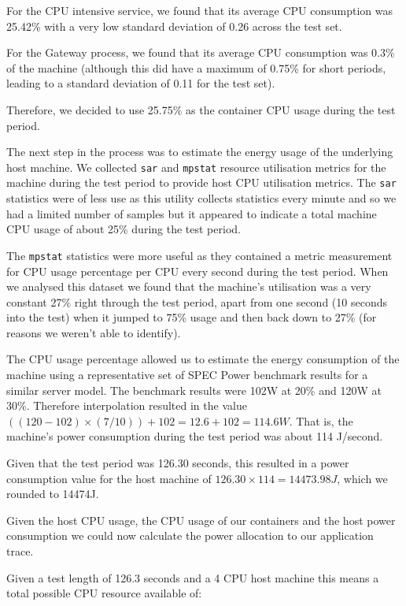 For the CPU intensive service, we found that its average CPU consumption was 25.42\% with a very low standard deviation of 0.26 across the test set.

For the Gateway process, we found that its average CPU consumption was 0.3\% of the machine (although this did have a maximum of 0.75\% for short periods, leading to a standard deviation of 0.11 for the test set).

Therefore, we decided to use 25.75\% as the container CPU usage during the test period.

The next step in the process was to estimate the energy usage of the underlying host machine.  We collected \texttt{sar} and \texttt{mpstat} resource utilisation metrics for the machine during the test period to provide host CPU utilisation metrics.  The \texttt{sar} statistics were of less use as this utility collects statistics every minute and so we had a limited number of samples but it appeared to indicate a total machine CPU usage of about 25\% during the test period.

The \texttt{mpstat} statistics were more useful as they contained a metric measurement for CPU usage percentage per CPU every second during the test period.  When we analysed this dataset we found that the machine's utilisation was a very constant 27\% right through the test period, apart from one second (10 seconds into the test) when it jumped to 75\% usage and then back down to 27\% (for reasons we weren't able to identify).

The CPU usage percentage allowed us to estimate the energy consumption of the machine using a representative set of SPEC Power benchmark results for a similar server model.  The benchmark results were 102W at 20\% and 120W at 30\%.  Therefore interpolation resulted in the value $((120 - 102) \times (7/10)) + 102 = 12.6 + 102 = 114.6W$.  That is, the machine's power consumption during the test period was about 114 J/second.

Given that the test period was 126.30 seconds, this resulted in a power consumption value for the host machine of $126.30 \times 114 = 14473.98J$, which we rounded to 14474J.

Given the host CPU usage, the CPU usage of our containers and the host power consumption we could now calculate the power allocation to our application trace.

Given a test length of 126.3 seconds and a 4 CPU host machine this means a total possible CPU resource available of:


